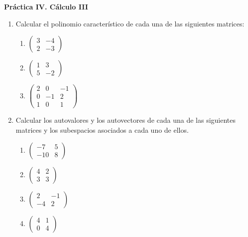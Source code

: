 \documentclass[12pt,letterpaper]{article}
\begin{document}
\begin{center}
    {\Large \bf Práctica IV. Cálculo III}
\end{center}

\begin{enumerate}
  \item Calcular el polinomio característico de cada una de las siguientes matrices:
  \begin{multicols}{3}
    \begin{enumerate}
    \item $\begin{pmatrix}
      3 & -4\\
      2 & -3
    \end{pmatrix}$
    \item $\begin{pmatrix}
      1 & 3\\
      5 & -2
    \end{pmatrix}$
    \item $\begin{pmatrix}
      2 & 0 & -1\\
      0 & -1 & 2\\
      1 & 0 & 1
    \end{pmatrix}$
    \end{enumerate}      
  \end{multicols}
  \item Calcular los autovalores y los autovectores de cada una de las siguientes matrices y los subespacios asociados a cada uno de ellos.
  \begin{multicols}{3}
    \begin{enumerate}
    \item $\begin{pmatrix}
      -7 & 5\\
      -10 & 8
    \end{pmatrix}$
    \item $\begin{pmatrix}
      4 & 2\\
      3 & 3
    \end{pmatrix}$
    \item $\begin{pmatrix}
      2 & -1\\
      -4 & 2
    \end{pmatrix}$
    \item $\begin{pmatrix}
      4 & 1\\
      0 & 4
    \end{pmatrix}$

\end{enumerate}
\end{multicols}
\end{enumerate}
\end{document}
